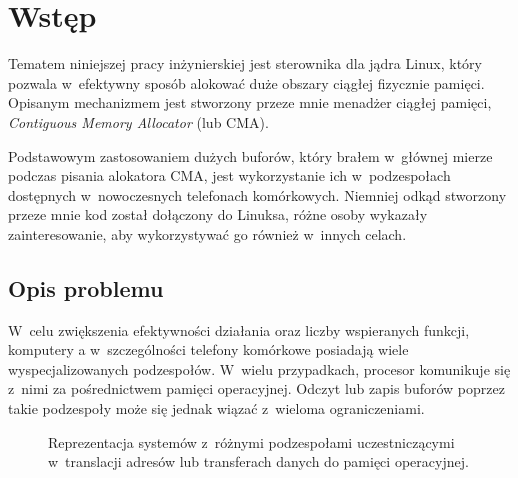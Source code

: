\chapter{Wstęp}

Tematem niniejszej pracy inżynierskiej jest sterownika dla jądra
Linux, który pozwala w~efektywny sposób alokować duże obszary ciągłej
fizycznie pamięci.  Opisanym mechanizmem jest stworzony przeze mnie
menadżer ciągłej pamięci, {\it Contiguous Memory Allocator} (lub CMA).

Podstawowym zastosowaniem dużych buforów, który brałem w~głównej
mierze podczas pisania alokatora CMA, jest wykorzystanie ich
w~podzespołach dostępnych w~nowoczesnych telefonach komórkowych.
Niemniej odkąd stworzony przeze mnie kod został dołączony do Linuksa,
różne osoby wykazały zainteresowanie, aby wykorzystywać go również
w~innych celach.


\section{Opis problemu}

W~celu zwiększenia efektywności działania oraz liczby wspieranych
funkcji, komputery a w~szczególności telefony komórkowe posiadają
wiele wyspecjalizowanych podzespołów.  W~wielu przypadkach, procesor
komunikuje się z~nimi za pośrednictwem pamięci operacyjnej.  Odczyt
lub zapis buforów poprzez takie podzespoły może się jednak wiązać
z~wieloma ograniczeniami.

\begin{figure}[tbp]
  \centering
   \qquad
  \qquad
  \caption[Różne przestrzenie adresowe dostępne
    w~komputerze.]{Reprezentacja systemów z~różnymi podzespołami
    uczestniczącymi w~translacji adresów lub transferach danych do
    pamięci operacyjnej.}
  \label{fig:mmu-iommu}
\end{figure}

